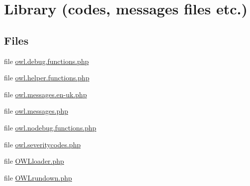 \section{Library (codes, messages files etc.)}
\label{group__OWL__LIBRARY}
\subsection*{Files}
\begin{DoxyCompactItemize}
\item 
file \hyperlink{owl_8debug_8functions_8php}{owl.debug.functions.php}
\item 
file \hyperlink{owl_8helper_8functions_8php}{owl.helper.functions.php}
\item 
file \hyperlink{owl_8messages_8en-uk_8php}{owl.messages.en-\/uk.php}
\item 
file \hyperlink{owl_8messages_8php}{owl.messages.php}
\item 
file \hyperlink{owl_8nodebug_8functions_8php}{owl.nodebug.functions.php}
\item 
file \hyperlink{owl_8severitycodes_8php}{owl.severitycodes.php}
\item 
file \hyperlink{OWLloader_8php}{OWLloader.php}
\item 
file \hyperlink{OWLrundown_8php}{OWLrundown.php}
\end{DoxyCompactItemize}
